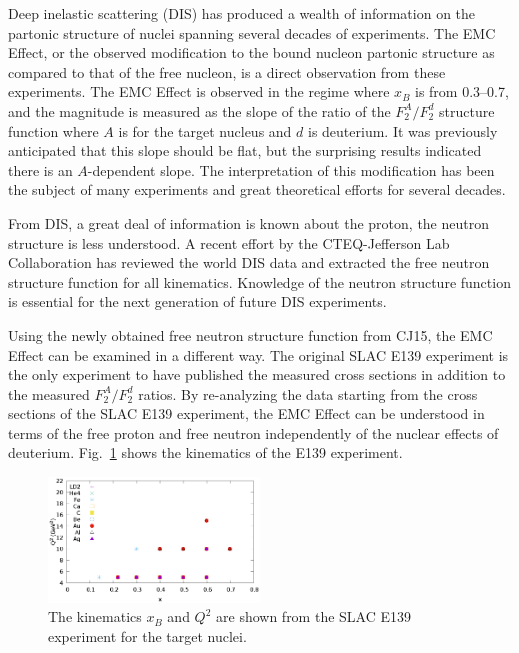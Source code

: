\documentclass[oneside]{article}
\begin{document}
Deep inelastic scattering (DIS) has produced a wealth of information on the partonic structure of nuclei spanning several decades of experiments. The EMC Effect, or the observed modification to the bound nucleon partonic structure as compared to that of the free nucleon, is a direct observation from these experiments. The EMC Effect is observed in the regime where $x_B$ is from 0.3--0.7, and the magnitude is measured as the slope of the ratio of the $F_2^A/F_2^d$ structure function where $A$ is for the target nucleus and $d$ is deuterium. It was previously anticipated that this slope should be flat, but the surprising results indicated there is an $A$-dependent slope. The interpretation of this modification has been the subject of many experiments and great theoretical efforts for several decades. 

From DIS, a great deal of information is known about the proton, the neutron structure is less understood. A recent effort by the CTEQ-Jefferson Lab Collaboration has reviewed the world DIS data and extracted the free neutron structure function for all kinematics. Knowledge of the neutron structure function is essential for the next generation of future DIS experiments. 

Using the newly obtained free neutron structure function from CJ15, the EMC Effect can be examined in a different way. The original SLAC E139 experiment is the only experiment to have published the measured cross sections in addition to the measured $F_2^A/F_2^d$ ratios. By re-analyzing the data starting from the cross sections of the SLAC E139 experiment, the EMC Effect can be understood in terms of the free proton and free neutron independently of the nuclear effects of deuterium. Fig.~\ref{fig:slac_q2x} shows the kinematics of the E139 experiment.


\begin{figure}[H]
  \centering
      	  \includegraphics[width=0.5\textwidth]{plots/F2ADdataQ2vsx.eps}
 	 \caption[]{The kinematics $x_B$ and $Q^2$ are shown from the SLAC E139 experiment for the target nuclei.}
  \label{fig:slac_q2x}
 \end{figure} 
\end{document}
